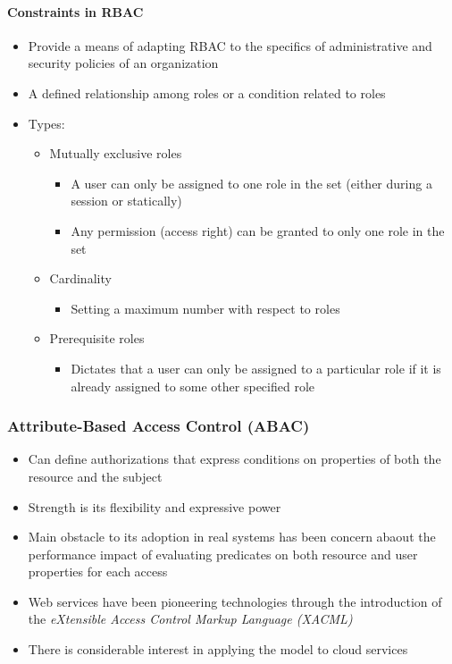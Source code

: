 \paragraph{Constraints in RBAC}
\begin{itemize}
    \item Provide a means of adapting RBAC to the specifics of administrative and security policies of an organization
    \item A defined relationship among roles or a condition related to roles
    \item Types:
    \begin{itemize}
        \item Mutually exclusive roles
        \begin{itemize}
            \item A user can only be assigned to one role in the set (either during a session or statically)
            \item Any permission (access right) can be granted to only one role in the set
        \end{itemize}
        \item Cardinality
        \begin{itemize}
            \item Setting a maximum number with respect to roles
        \end{itemize}
        \item Prerequisite roles
        \begin{itemize}
            \item Dictates that a user can only be assigned to a particular role if it is already assigned to some other specified role
        \end{itemize}
    \end{itemize}
\end{itemize}

\newpage

\subsubsection{Attribute-Based Access Control (ABAC)}
\begin{itemize}
    \item Can define authorizations that express conditions on properties of both the resource and the subject
    \item Strength is its flexibility and expressive power
    \item Main obstacle to its adoption in real systems has been concern abaout the performance impact of evaluating predicates on both resource and user properties for each access
    \item Web services have been pioneering technologies through the introduction of the \textit{eXtensible Access Control Markup Language (XACML)}
    \item There is considerable interest in applying the model to cloud services
\end{itemize}

